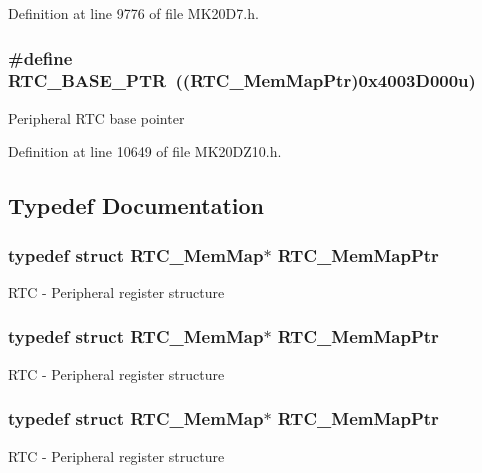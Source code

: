 Definition at line 9776 of file M\+K20\+D7.\+h.

\subsubsection[{\texorpdfstring{R\+T\+C\+\_\+\+B\+A\+S\+E\+\_\+\+P\+TR}{RTC_BASE_PTR}}]{\setlength{\rightskip}{0pt plus 5cm}\#define R\+T\+C\+\_\+\+B\+A\+S\+E\+\_\+\+P\+TR~(({\bf R\+T\+C\+\_\+\+Mem\+Map\+Ptr})0x4003\+D000u)}\hypertarget{group___r_t_c___peripheral_ga6455e2b767b4b224b4f00b50e87a2441}{}\label{group___r_t_c___peripheral_ga6455e2b767b4b224b4f00b50e87a2441}
Peripheral R\+TC base pointer 

Definition at line 10649 of file M\+K20\+D\+Z10.\+h.



\subsection{Typedef Documentation}
\subsubsection[{\texorpdfstring{R\+T\+C\+\_\+\+Mem\+Map\+Ptr}{RTC_MemMapPtr}}]{\setlength{\rightskip}{0pt plus 5cm}typedef struct {\bf R\+T\+C\+\_\+\+Mem\+Map}$\ast$ {\bf R\+T\+C\+\_\+\+Mem\+Map\+Ptr}}\hypertarget{group___r_t_c___peripheral_gac92da66fe1171e5751505df29917b152}{}\label{group___r_t_c___peripheral_gac92da66fe1171e5751505df29917b152}
R\+TC -\/ Peripheral register structure 
\subsubsection[{\texorpdfstring{R\+T\+C\+\_\+\+Mem\+Map\+Ptr}{RTC_MemMapPtr}}]{\setlength{\rightskip}{0pt plus 5cm}typedef struct {\bf R\+T\+C\+\_\+\+Mem\+Map}$\ast$ {\bf R\+T\+C\+\_\+\+Mem\+Map\+Ptr}}\hypertarget{group___r_t_c___peripheral_gac92da66fe1171e5751505df29917b152}{}\label{group___r_t_c___peripheral_gac92da66fe1171e5751505df29917b152}
R\+TC -\/ Peripheral register structure 
\subsubsection[{\texorpdfstring{R\+T\+C\+\_\+\+Mem\+Map\+Ptr}{RTC_MemMapPtr}}]{\setlength{\rightskip}{0pt plus 5cm}typedef struct {\bf R\+T\+C\+\_\+\+Mem\+Map}$\ast$ {\bf R\+T\+C\+\_\+\+Mem\+Map\+Ptr}}\hypertarget{group___r_t_c___peripheral_gac92da66fe1171e5751505df29917b152}{}\label{group___r_t_c___peripheral_gac92da66fe1171e5751505df29917b152}
R\+TC -\/ Peripheral register structure 